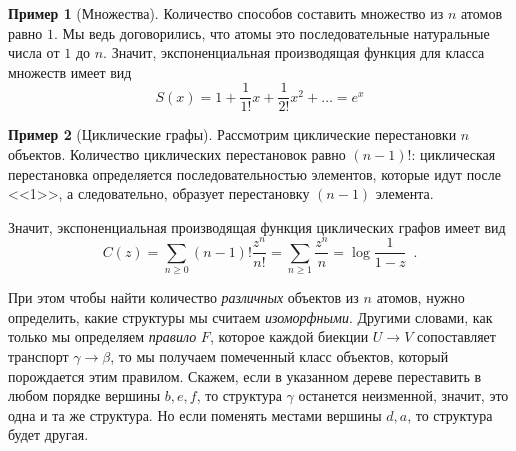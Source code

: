 \documentclass{article}
\theoremstyle{definition}
\newtheorem{example}{Пример}
\begin{document}
\begin{example}[Множества]
	Количество способов составить множество из \( n \) атомов равно \( 1 \). Мы 
	ведь договорились, что атомы это последовательные натуральные числа от \( 1 
	\) до \( n \). Значит, экспоненциальная производящая функция для класса 
	множеств имеет вид
	\[
		S(x) = 1 + \dfrac{1}{1!}x + \dfrac{1}{2!}x^2 + \ldots = e^x
	\]
\end{example}

\begin{example}[Циклические графы]
	Рассмотрим циклические перестановки \( n \) объектов. Количество 
	циклических перестановок равно \( (n-1)! \): циклическая перестановка 
	определяется последовательностью элементов, которые идут после <<1>>, а 
	следовательно, образует перестановку \( (n-1) \) элемента.
	
	Значит, экспоненциальная производящая функция циклических графов имеет вид
	\[
		C(z) = \sum_{n \geq 0} (n-1)! \dfrac{z^n}{n!} = \sum_{n \geq 1} 
		\dfrac{z^n}{n} = \log \dfrac{1}{1 - z} \enspace .
	\]
\end{example}

При этом чтобы найти количество \textit{различных} объектов из \( n \) атомов, 
нужно определить, какие структуры мы считаем \textit{изоморфными}. Другими 
словами, как только мы определяем \textit{правило} \( F \), которое каждой 
биекции \( U 
\to V \) сопоставляет транспорт \( \gamma \to \beta \), то мы получаем 
помеченный класс объектов, который порождается этим правилом. Скажем, 
если в 
указанном дереве переставить в любом порядке вершины \( b, e, f \), то 
структура \( \gamma \) останется неизменной, значит, это одна и та же 
структура. Но если поменять местами вершины \( d, a \), то структура будет 
другая.
\end{document}
